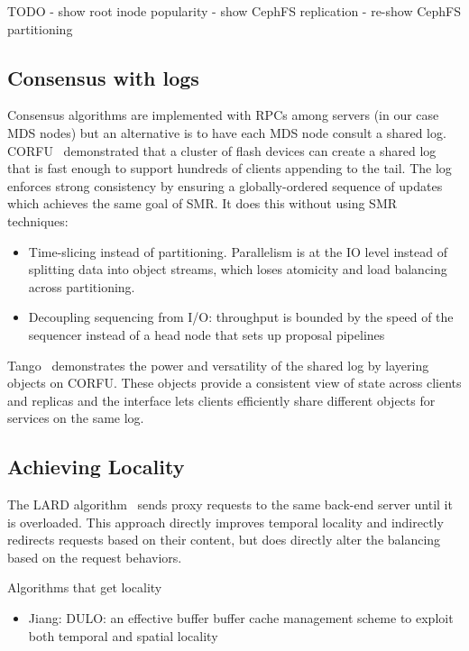 \documentclass[conference]{acm_proc_article-sp} \usepackage[english]{babel}
\begin{document}
TODO
- show root inode popularity
- show CephFS replication
- re-show CephFS partitioning

\subsection{Consensus with logs}

Consensus algorithms are implemented with RPCs among servers (in our case MDS
nodes) but an alternative is to have each MDS node consult a shared log.
CORFU~\cite{balakrishnan:nsdi12-corfu} demonstrated that a cluster of flash devices can create a
shared log that is fast enough to support hundreds of clients appending to the
tail. The log enforces strong consistency by ensuring a globally-ordered sequence of updates which achieves the same goal of SMR. It does this without using SMR techniques:
\begin{itemize}
	\item Time-slicing instead of partitioning. Parallelism
    is at the IO level instead of splitting data into object streams, which loses
    atomicity and load balancing across partitioning.
    \item Decoupling sequencing from I/O: throughput is bounded by the speed of
    the sequencer instead of a head node that sets up proposal pipelines
\end{itemize}

Tango~\cite{balakrishnan:sosp13-tango} demonstrates the power and versatility of the shared log by layering objects on CORFU. These objects provide a consistent view of state
across clients and replicas and the interface lets clients efficiently share
different objects for services on the same log.



\subsection{Achieving Locality} The LARD algorithm~\cite{pai:asplos1998-lard}
sends proxy requests to the same back-end server until it is overloaded. This
approach directly improves temporal locality and indirectly redirects requests
based on their content, but does directly alter the balancing based on the
request behaviors.

Algorithms that get locality \begin{itemize} \item Jiang: DULO: an effective
buffer buffer cache management scheme to exploit both temporal and spatial
locality \end{itemize}
\end{document}
